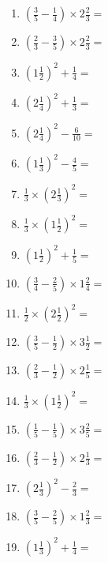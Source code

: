 \documentclass[12pt]{article}
\begin{document}
\begin{enumerate}
\item \large $ \left( \frac{3}{5} - \frac{1}{4} \right) \times 2 \frac{2}{3} = $ \vspace{1.6cm}
\item \large $ \left( \frac{2}{3} - \frac{3}{5} \right) \times 2 \frac{2}{3} = $ \vspace{1.6cm}
\item \large $ \left( 1 \frac{1}{2} \right)^2 + \frac{1}{4} = $ \vspace{1.6cm}
\item \large $ \left( 2 \frac{1}{4} \right)^2 + \frac{1}{3} = $ \vspace{1.6cm}
\item \large $ \left( 2 \frac{1}{4} \right)^2 - \frac{6}{10} = $ \vspace{1.6cm}
\item \large $ \left( 1 \frac{1}{3} \right)^2 - \frac{4}{5} = $ \vspace{1.6cm}
\item \large $ \frac{1}{3} \times \left( 2 \frac{1}{3} \right)^2 = $ \vspace{1.6cm}
\item \large $ \frac{1}{3} \times \left( 1 \frac{1}{2} \right)^2 = $ \vspace{1.6cm}
\item \large $ \left( 1 \frac{1}{2} \right)^2 + \frac{1}{5} = $ \vspace{1.6cm}
\newpage
\item \large $ \left( \frac{3}{4} - \frac{2}{5} \right) \times 1 \frac{2}{4} = $ \vspace{1.6cm}
\item \large $ \frac{1}{2} \times \left( 2 \frac{1}{2} \right)^2 = $ \vspace{1.6cm}
\item \large $ \left( \frac{3}{5} - \frac{1}{2} \right) \times 3 \frac{1}{2} = $ \vspace{1.6cm}
\item \large $ \left( \frac{2}{3} - \frac{1}{2} \right) \times 2 \frac{1}{5} = $ \vspace{1.6cm}
\item \large $ \frac{1}{3} \times \left( 1 \frac{1}{2} \right)^2 = $ \vspace{1.6cm}
\item \large $ \left( \frac{1}{5} - \frac{1}{5} \right) \times 3 \frac{2}{5} = $ \vspace{1.6cm}
\item \large $ \left( \frac{2}{3} - \frac{1}{2} \right) \times 2 \frac{1}{3} = $ \vspace{1.6cm}
\item \large $ \left( 2 \frac{1}{3} \right)^2 - \frac{2}{3} = $ \vspace{1.6cm}
\item \large $ \left( \frac{3}{5} - \frac{2}{5} \right) \times 1 \frac{2}{3} = $ \vspace{1.6cm}
\item \large $ \left( 1 \frac{1}{3} \right)^2 + \frac{1}{4} = $ \vspace{1.6cm}
\end{enumerate}\newpage
\end{document}
